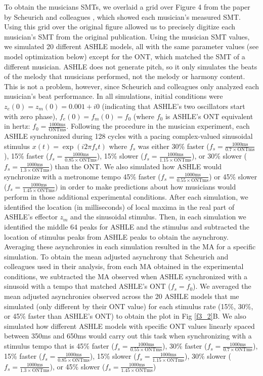 \documentclass{report}
\begin{document}
To obtain the musicians SMTs, we overlaid a grid over Figure 4 from the paper by Scheurich and colleagues \cite{scheurich2018tapping}, which showed each musician's measured SMT. Using this grid over the original figure allowed us to precisely digitize each musician's SMT from the original publication. Using the musician SMT values, we simulated 20 different ASHLE models, all with the same parameter values (see model optimization below) except for the ONT, which matched the SMT of a different musician. ASHLE does not generate pitch, so it only simulates the beats of the melody that musicians performed, not the melody or harmony content. This is not a problem, however, since Scheurich and colleagues only analyzed each musician's beat performance. In all simulations, initial conditions were $z_e(0)=z_m(0)= 0.001 + i0$ (indicating that ASHLE's two oscillators start with zero phase), $f_e(0)=f_m(0)=f_0$ (where $f_0$ is ASHLE's ONT equivalent in hertz: $f_0=\frac{1000 \text{ms}}{\text{ONTms}}$. Following the procedure in the musician experiment, each ASHLE synchronized during 128 cycles with a pacing complex-valued sinusoidal stimulus $x(t)=\exp(i2\pi f_s t)$ where $f_s$ was either 30\% faster ($f_s=\frac{1000 \text{ms}}{0.7 \times \text{ONTms}}$), 15\% faster ($f_s=\frac{1000 \text{ms}}{0.85 \times \text{ONTms}}$), 15\% slower ($f_s=\frac{1000 \text{ms}}{1.15 \times \text{ONTms}}$), or 30\% slower ($f_s=\frac{1000 \text{ms}}{1.3 \times \text{ONTms}}$) than the ONT. We also simulated how ASHLE would synchronize with a metronome tempo 45\% faster ($f_s=\frac{1000 \text{ms}}{0.55 \times \text{ONTms}}$) or 45\% slower ($f_s=\frac{1000 \text{ms}}{1.45 \times \text{ONTms}}$) in order to make predictions about how musicians would perform in those additional experimental conditions. After each simulation, we identified the location (in milliseconds) of local maxima in the real part of ASHLE's effector $z_m$ and the sinusoidal stimulus. Then, in each simulation we identified the middle 64 peaks for ASHLE and the stimulus and subtracted the location of stimulus peaks from ASHLE peaks to obtain the asynchrony. Averaging these asynchronies in each simulation resulted in the MA for a specific simulation. To obtain the mean adjusted asynchrony that Scheurich and colleagues used in their analysis, from each MA obtained in the experimental conditions, we subtracted the MA observed when ASHLE synchronized with a sinusoid with a tempo that matched ASHLE's ONT ($f_s=f_0$). We averaged the mean adjusted asynchronies observed across the 20 ASHLE models that me simulated (only different by their ONT value) for each stimulus rate (15\%, 30\%, or 45\% faster than ASHLE's ONT) to obtain the plot in Fig \ref{f3_2}B. We also simulated how different ASHLE models with specific ONT values linearly spaced between 350ms and 650ms would carry out this task when synchronizing with a stimulus tempo that is 45\% faster ($f_s=\frac{1000 \text{ms}}{0.55 \times \text{ONTms}}$), 30\% faster ($f_s=\frac{1000 \text{ms}}{0.7 \times \text{ONTms}}$), 15\% faster ($f_s=\frac{1000 \text{ms}}{0.85 \times \text{ONTms}}$), 15\% slower ($f_s=\frac{1000 \text{ms}}{1.15 \times \text{ONTms}}$), 30\% slower ($f_s=\frac{1000 \text{ms}}{1.3 \times \text{ONTms}}$), or 45\% slower ($f_s=\frac{1000 \text{ms}}{1.45 \times \text{ONTms}}$) 
\end{document}
